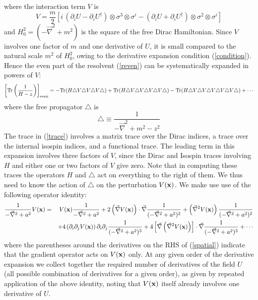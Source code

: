 \documentclass[a4paper,prd,showpacs,showkeys]{revtex4}
\begin{document}
where the interaction term $V$ is
\begin{equation}
V=\frac{m}{2} \left[i \, (\partial_i U -\partial_i U^{\dagger}) \otimes \sigma^3 \otimes \sigma^i - (\partial_i U +\partial_i U^{\dagger}) \otimes \sigma^2 \otimes \sigma^i\right]
\end{equation}
and $H_0 ^{2}=(-\vec{\nabla}^2 +m^2)$ is the square of the free Dirac Hamiltonian. Since $V$ involves one factor of $m$ and one derivative of $U$, it is small compared to the natural scale $m^2$ of $H_{0}^2$, owing to the derivative expansion condition (\ref{condition}). Hence the even part of the resolvent (\ref{reven}) can be systematically expanded in powers of $V$:
\begin{equation}
\left[\textrm{Tr}\left(\frac{1}{H-z}\right)\right]_{\rm{even}}= -\text{Tr}( H\triangle V \triangle V \triangle V \triangle) + \textrm{Tr}(H\triangle V \triangle V \triangle V \triangle V \triangle)-\textrm{Tr}(H\triangle V \triangle V \triangle V \triangle V \triangle V \triangle) + \cdots
\label{trace}
\end{equation}
where the free propagator $\triangle$ is 
\begin{equation}
\triangle \equiv \frac{1}{-\vec{\nabla}^2 +m^2 -z^2}
\end{equation}
The trace in (\ref{trace}) involves a matrix trace over the Dirac indices, a trace over the internal isospin indices, and a functional trace. The leading term in this expansion involves three factors of $V$, since the Dirac and Isospin traces involving $H$ and either one or two factors of $V$ give zero. Note that in computing these traces the operators $H$ and $\triangle$ act on everything to the right of them. We thus need to know the action of $\triangle$ on the perturbation $V({\bf x})$. We make use use of the following operator identity:
\begin{eqnarray}
\frac{1}{-\vec{\nabla}^{2}+a^{2}} V({\bf x})&=&V({\bf x})\frac{1}{-\vec{\nabla}^{2}+
a^{2}} +2\left(\vec{\nabla}V({\bf x})\right)\cdot
\vec{\nabla}\frac{1}{(-\vec{\nabla}^{2}+a^{2})^{2}}+\left(\vec{\nabla}^{2}
V({\bf x})\right)\frac{1}{(-\vec{\nabla}^{2}+a^{2})^{2}}                                                                                                    \nonumber\\ & & + 4\left(\partial_{i} \partial_{j}  V({\bf x})\right)\partial_{i} \partial_{j}
\frac{1}{(-\vec{\nabla}^{2}+a^{2})^{3}}+4\left[\vec{\nabla}\left(\vec{\nabla}^{2} V({\bf x})\right)\right] \cdot
\vec{\nabla} \frac{1}{(-\vec{\nabla}^{2}+a^{2})^{3}}+\cdots
\label{spatial}
\end{eqnarray}
where the parentheses around the derivatives on the RHS of (\ref{spatial}) indicate that the gradient operator acts on $V({\bf x})$ only.  At any given order of the derivative expansion we collect together the required number of derivatives of the field $U$ (all possible combination of derivatives for a given order), as given by repeated application of the above identity, noting that $V({\bf x})$ itself already involves one derivative of $U$. 
\end{document}
